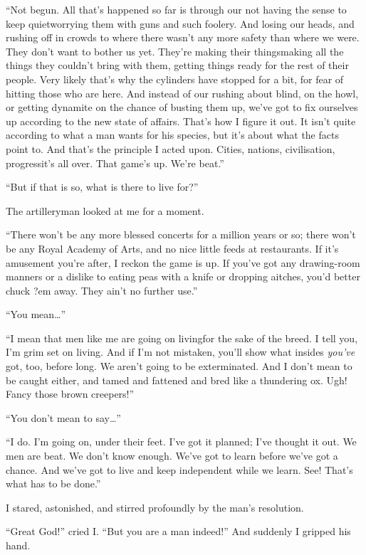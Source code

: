 ``Not begun. All that's happened so far is through our not having
the sense to keep quiet\dash{}worrying them with guns and such foolery.
And losing our heads, and rushing off in crowds to where there
wasn't any more safety than where we were. They don't want to
bother us yet. They're making their things\dash{}making all the things
they couldn't bring with them, getting things ready for the rest of
their people. Very likely that's why the cylinders have stopped for
a bit, for fear of hitting those who are here. And instead of our
rushing about blind, on the howl, or getting dynamite on the chance
of busting them up, we've got to fix ourselves up according to the
new state of affairs. That's how I figure it out. It isn't quite
according to what a man wants for his species, but it's about what
the facts point to. And that's the principle I acted upon. Cities,
nations, civilisation, progress\dash{}it's all over. That game's up.
We're beat.''

``But if that is so, what is there to live for?''

The artilleryman looked at me for a moment.

``There won't be any more blessed concerts for a million years or
so; there won't be any Royal Academy of Arts, and no nice little
feeds at restaurants. If it's amusement you're after, I reckon the
game is up. If you've got any drawing-room manners or a dislike to
eating peas with a knife or dropping aitches, you'd better chuck
?em away. They ain't no further use.''

``You mean\ldots{}''

``I mean that men like me are going on living\dash{}for the sake of the
breed. I tell you, I'm grim set on living. And if I'm not mistaken,
you'll show what insides \emph{you've} got, too, before long. We
aren't going to be exterminated. And I don't mean to be caught
either, and tamed and fattened and bred like a thundering ox. Ugh!
Fancy those brown creepers!''

``You don't mean to say\ldots{}''

``I do. I'm going on, under their feet. I've got it planned; I've
thought it out. We men are beat. We don't know enough. We've got to
learn before we've got a chance. And we've got to live and keep
independent while we learn. See! That's what has to be done.''

I stared, astonished, and stirred profoundly by the man's
resolution.

``Great God!'' cried I. ``But you are a man indeed!'' And suddenly I
gripped his hand.

